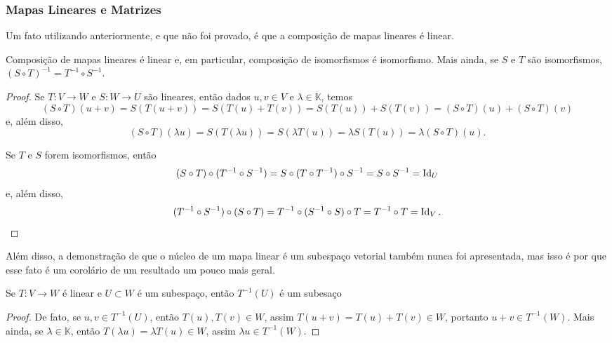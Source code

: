 \subsubsection*{Mapas Lineares e Matrizes}

Um fato utilizando anteriormente, e que não foi provado, é que a composição de mapas lineares é linear.

\begin{proposition}
    Composição de mapas lineares é linear e, em particular, composição de isomorfismos é isomorfismo. Mais ainda, se $S$ e $T$ são isomorfismos, $(S \circ T)^{-1} = T^{-1} \circ S^{-1}$.
\end{proposition}
\begin{proof}
    Se $T \colon V \to W$ e $S \colon W \to U$ são lineares, então dados $u,v \in V$ e $\lambda \in \mathbb{K}$, temos \begin{equation}
        (S \circ T)(u + v) = S(T(u + v)) = S(T(u) + T(v)) = S(T(u)) + S(T(v)) = (S \circ T)(u) + (S \circ T)(v)
    \end{equation} e, além disso, \begin{equation}
        (S \circ T)(\lambda u) = S(T(\lambda u)) = S(\lambda T(u)) = \lambda S(T(u)) = \lambda (S \circ T)(u).
    \end{equation}

    Se $T$ e $S$ forem isomorfismos, então \begin{equation}
        (S \circ T) \circ (T^{-1} \circ S^{-1}) = S \circ (T \circ T^{-1}) \circ S^{-1} = S \circ S^{-1} = \operatorname{Id}_U
    \end{equation} e, além disso, \begin{equation}
        (T^{-1} \circ S^{-1}) \circ (S \circ T) = T^{-1} \circ (S^{-1} \circ S) \circ T = T^{-1} \circ T = \operatorname{Id}_V.
    \end{equation}
\end{proof}

Além disso, a demonstração de que o núcleo de um mapa linear é um subespaço vetorial também nunca foi apresentada, mas isso é por que esse fato é um corolário de um resultado um pouco mais geral.

\begin{proposition}
    Se $T \colon V \to W$ é linear e $U \subset W$ é um subespaço, então $T^{-1}(U)$ é um subesaço
\end{proposition}
\begin{proof}
    De fato, se $u, v \in T^{-1}(U)$, então $T(u), T(v) \in W$, assim $T(u + v) = T(u) + T(v) \in W$, portanto $u + v \in T^{-1}(W)$. Mais ainda, se $\lambda \in \mathbb{K}$, então $T(\lambda u) = \lambda T(u) \in W$, assim $\lambda u \in T^{-1}(W)$.
\end{proof}

